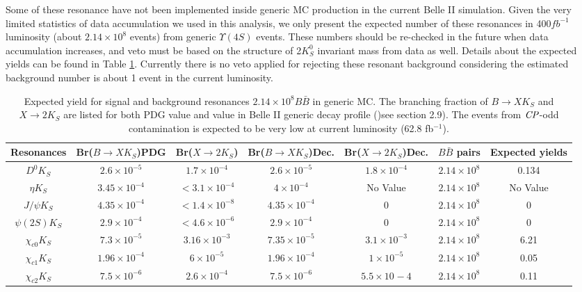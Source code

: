  Some of these resonance have not been implemented inside generic MC production in the current Belle II simulation. Given the very limited statistics of data accumulation we used in this analysis, we only present the expected number of these resonances in 400$fb^{-1}$ luminosity (about $2.14 \times 10^8$ events) from generic $\Upsilon{(4S)}$ events. These numbers should be re-checked in the future when data accumulation increases, and veto must be based on the structure of 2$K_S^0$ invariant mass from data as well. Details about the expected yields can be found in Table \ref{tab:f_res}. Currently there is no veto applied for rejecting these resonant background considering the estimated background number is about 1 event in the current luminosity.
\begin{table}
	\caption{Expected yield for signal and background resonances $2.14\times 10^8 B\bar{B}$ in generic MC. The branching fraction of $B\to X K_S$ and $X \to 2K_S$ are listed for both PDG value and value in Belle II generic decay profile ()see section 2.9). The events from $\it{CP}$-odd contamination is expected to be very low at current luminosity (62.8 fb$^{-1}$).}
	\label{tab:f_res}
	\centering
	\begin{tabular}{|c|c|c|c|c|c|c|}
		\hline
		Resonances & Br($B \to X K_S$)PDG  & Br($X \to2K_S$) & Br($B \to X K_S$)Dec. & Br($X \to2K_S$)Dec. & $B\bar{B}$ pairs & Expected yields \\
		\hline
		$D^0 K_S$ & $2.6 \times 10^{-5}$ & $1.7\times 10^{-4}$ & $2.6 \times 10^{-5}$ & $1.8\times 10^{-4}$ & $2.14\times 10^8$ & 0.134 \\
		\hline
		$\eta K_S$ & $3.45\times 10^{-4}$ & $<3.1\times 10^{-4}$ & $4\times 10^{-4}$ & No Value & $2.14\times 10^8$ & No Value  \\
		\hline
		$J/\psi K_S$ & $4.35\times 10^{-4}$ & $<1.4\times 10^{-8}$ & $4.35\times 10^{-4}$ & 0 & $2.14\times 10^8$ & 0 \\
		\hline
		$\psi(2S)K_S$ & $2.9\times 10^{-4}$ & $<4.6\times 10^{-6}$ & $2.9\times 10^{-4}$ & 0 & $2.14\times 10^8$ & 0 \\
		\hline
		$\chi_{c0}K_S$ & $7.3\times 10^{-5}$ & $3.16\times 10^{-3}$ & $7.35\times 10^{-5}$ & $3.1\times 10^{-3}$ & $2.14\times 10^8$ & 6.21 \\
		\hline
		$\chi_{c1}K_S$ & $1.96\times 10^{-4}$ & $6\times 10^{-5}$ & $1.96\times 10^{-4}$ & $1\times 10^{-5}$ & $2.14\times 10^8$ & 0.05 \\
		\hline
		$\chi_{c2}K_S$ & $7.5\times 10^{-6}$ & $2.6\times 10^{-4}$ & $7.5\times 10^{-6}$ & $5.5\times 10^{}-4$ & $2.14\times 10^8$ & 0.11 \\

\end{tabular}
\end{table}
